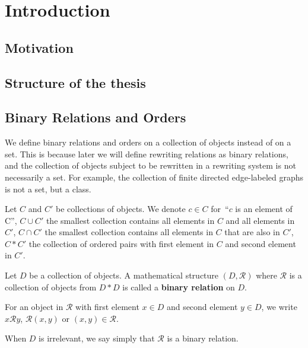 \documentclass{book}
\begin{document}
  
  
  
 
\tableofcontents  
\newpage     
     
\part{Introduction} 
\chapter{Motivation}

\chapter{Structure of the thesis}
 

\chapter{Binary Relations and Orders}  

We define binary relations and orders on a collection of objects instead of on a set. This is because later we will define rewriting relations as binary relations, and the collection of objects subject to be rewritten in a rewriting system is not necessarily a set. For example, the collection of finite directed edge-labeled graphs is not a set, but a class.

\begin{notation}
    Let $C$ and $C'$ be collections of objects. We denote $c \in C$ for~\enquote{$c$ is an element of C}, $C \cup C'$ the smallest collection contains all elements in $C$ and all elements in $C'$, $C \cap C'$ the smallest collection contains all elements in $C$ that are also in $C'$, $C * C'$ the collection of ordered pairs with first element in $C$ and second element in $C'$.  
  \end{notation} 
  
  \begin{definition}
    \label{def:binary_relation:binary_relation}
    Let $D$ be a collection of objects. A mathematical structure \( (D, \mathcal{R}) \) where $\mathcal{R}$ is a collection of objects from $D * D$ is called a \textbf{binary relation} on $D$. 
    
    For an object in $\mathcal{R}$ with first element $x \in D$ and second element $y\in D$, we write $x \mathcal{R} y$, $\mathcal{R}(x,y)$ or $(x,y) \in \mathcal{R}$. 
    
    When $D$ is irrelevant, we say simply that $\mathcal{R}$ is a binary relation.
  \end{definition} 
   
\end{document}
